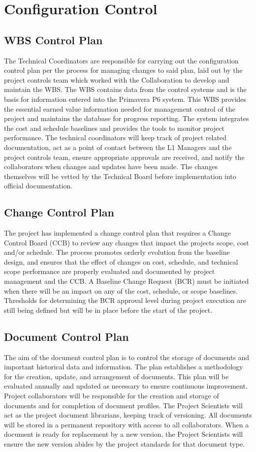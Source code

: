 \section{Configuration Control}


\subsection{WBS Control Plan}
The Technical Coordinators are responsible for carrying out the configuration control plan per the process for managing changes to said plan, laid out by the project controls team which worked with the Collaboration to develop and maintain the WBS. The WBS contains data from the control systems and is the basis for information entered into the Primavera P6 system. This WBS provides the essential earned value information needed for management control of the project and maintains the database for progress reporting. The system integrates the cost and schedule baselines and provides the tools to monitor project performance. The technical coordinators will keep track of project related documentation, act as a point of contact between the L1 Managers and the project controls team, ensure appropriate approvals are received, and notify the collaborators when changes and updates have been made. The changes themselves will be vetted by the Technical Board before implementation into official documentation.

\subsection{Change Control Plan}
The project has implemented a change control plan that requires a Change Control Board (CCB) to review any changes that impact the projects scope, cost and/or schedule. The process promotes orderly evolution from the baseline design, and ensures that the effect of changes on cost, schedule, and technical scope performance are properly evaluated and documented by project management and the CCB. A Baseline Change Request (BCR) must be initiated when there will be an impact on any of the cost, schedule, or scope baselines. Thresholds for determining the BCR approval level during project execution are still being defined but will be in place before the start of the project.

\subsection{Document Control Plan}
The aim of the document control plan is to control the storage of documents and important historical data and information. The plan establishes a methodology for the creation, update, and arrangement of documents. This plan will be evaluated annually and updated as necessary to ensure continuous improvement.  Project collaborators will be responsible for the creation and storage of documents and for completion of document profiles.  The Project Scientists will act as the project document librarians, keeping track of versioning.  All documents will be stored in a permanent repository with access to all collaborators.  When a document is ready for replacement by a new version, the Project Scientists will ensure the new version abides by the project standards for that document type.  
%
